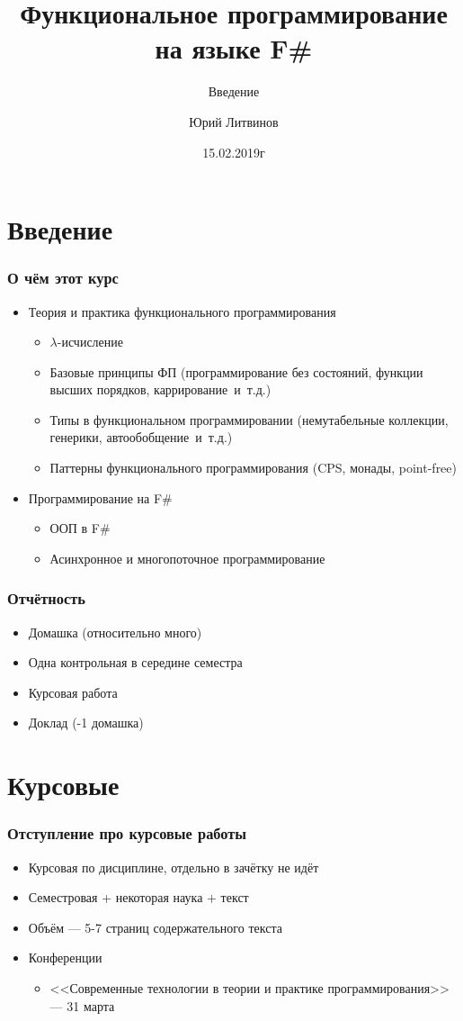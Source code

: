 \documentclass[xetex,mathserif,serif]{beamer}
\title{Функциональное программирование на языке F\#}
\subtitle{Введение}
\author{Юрий Литвинов}
\date{15.02.2019г}
\begin{document}
	
	\frame{\titlepage}
	
	\section{Введение}
	
	\begin{frame}
		\frametitle{О чём этот курс}
		\begin{itemize}
			\item Теория и практика функционального программирования
			\begin{itemize}
				\item $\lambda$-исчисление
				\item Базовые принципы ФП (программирование без состояний, функции высших порядков, каррирование~и~т.д.)
				\item Типы в функциональном программировании (немутабельные коллекции,
					генерики, автообобщение~и~т.д.)
				\item Паттерны функционального программирования (CPS, монады, point-free)
			\end{itemize}
			\item Программирование на F\# 
			\begin{itemize}
				\item ООП в F\#
				\item Асинхронное и многопоточное программирование
			\end{itemize}
		\end{itemize}
	\end{frame}

	\begin{frame}
		\frametitle{Отчётность}
		\begin{itemize}
			\item Домашка (относительно много)
			\item Одна контрольная в середине семестра
			\item Курсовая работа
			\item Доклад (-1 домашка)
		\end{itemize}
	\end{frame}
	
	\section{Курсовые}

	\begin{frame}
		\frametitle{Отступление про курсовые работы}
		\begin{itemize}
			\item Курсовая по дисциплине, отдельно в зачётку не идёт
			\item Семестровая + некоторая наука + текст
			\item Объём --- 5-7 страниц содержательного текста
			\item Конференции
			\begin{itemize}
				\item {}<<Современные технологии в теории и практике программирования>> --- 31 марта
			\end{itemize}
		\end{itemize}
	\end{frame}
	
\end{document}
